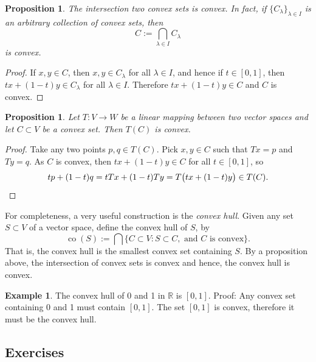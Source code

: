 \documentclass[12pt]{book}
\newcommand{\R}{{\mathbb{R}}}
\newcommand{\myindex}[1]{#1\index{#1}}
\theoremstyle{plain}
\newtheorem{prop}[thm]{Proposition}
\theoremstyle{remark}
\theoremstyle{definition}
\theoremstyle{exercise}
\theoremstyle{example}
\newtheorem{example}[thm]{Example}
\begin{document}
\begin{prop}
The intersection two convex sets is convex.  In fact,
if $\{ C_\lambda \}_{\lambda \in I}$ is
an arbitrary collection of convex sets, then
\begin{equation*}
C := \bigcap_{\lambda \in I} C_\lambda
\end{equation*}
is convex.
\end{prop}

\begin{proof}
If $x, y \in C$, then $x,y \in C_\lambda$ for all
$\lambda \in I$, and hence if $t \in [0,1]$, then $tx + (1-t)y \in
C_\lambda$ for all $\lambda \in I$.  Therefore $tx + (1-t)y \in C$ and $C$
is convex.
\end{proof}

\begin{prop}
Let $T \colon V \to W$ be a linear mapping between two vector spaces and
let $C \subset V$ be a convex set.  Then $T(C)$ is convex.
\end{prop}

\begin{proof}
Take any two points $p,q \in T(C)$.  Pick $x,y \in C$ such that
$Tx = p$ and $Ty=q$.  As $C$ is convex, then
$tx+(1-t)y \in C$
for all $t \in [0,1]$, so
\begin{equation*}
tp+(1-t)q 
=
tTx+(1-t)Ty
=
T\bigl(tx+(1-t)y\bigr)
\in T(C) .  \qedhere
\end{equation*}
\end{proof}

For completeness, a very useful construction is the
\emph{\myindex{convex hull}}.  Given any set $S \subset V$ of a vector
space, define the convex hull of $S$, by
\begin{equation*}
\operatorname{co}(S) :=
\bigcap \{ C \subset V : S \subset C, \text{ and $C$ is convex} \} .
\end{equation*}
That is, the convex hull is the smallest convex set containing $S$.  
By a proposition above, the intersection of convex sets is convex and
hence, the convex hull is convex.

\begin{example}
The convex hull of 0 and 1 in $\R$ is $[0,1]$.  Proof:
Any convex set containing 0 and 1 must contain $[0,1]$.  The set $[0,1]$
is convex, therefore it must be the convex hull.
\end{example}

\subsection{Exercises}
\end{document}
